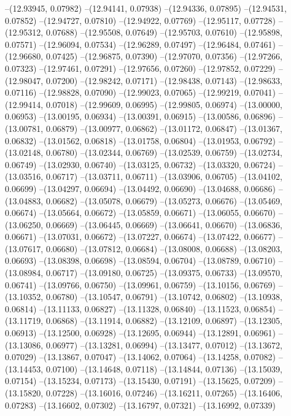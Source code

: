 --(12.93945, 0.07982)
--(12.94141, 0.07938)
--(12.94336, 0.07895)
--(12.94531, 0.07852)
--(12.94727, 0.07810)
--(12.94922, 0.07769)
--(12.95117, 0.07728)
--(12.95312, 0.07688)
--(12.95508, 0.07649)
--(12.95703, 0.07610)
--(12.95898, 0.07571)
--(12.96094, 0.07534)
--(12.96289, 0.07497)
--(12.96484, 0.07461)
--(12.96680, 0.07425)
--(12.96875, 0.07390)
--(12.97070, 0.07356)
--(12.97266, 0.07323)
--(12.97461, 0.07291)
--(12.97656, 0.07260)
--(12.97852, 0.07229)
--(12.98047, 0.07200)
--(12.98242, 0.07171)
--(12.98438, 0.07143)
--(12.98633, 0.07116)
--(12.98828, 0.07090)
--(12.99023, 0.07065)
--(12.99219, 0.07041)
--(12.99414, 0.07018)
--(12.99609, 0.06995)
--(12.99805, 0.06974)
--(13.00000, 0.06953)
--(13.00195, 0.06934)
--(13.00391, 0.06915)
--(13.00586, 0.06896)
--(13.00781, 0.06879)
--(13.00977, 0.06862)
--(13.01172, 0.06847)
--(13.01367, 0.06832)
--(13.01562, 0.06818)
--(13.01758, 0.06804)
--(13.01953, 0.06792)
--(13.02148, 0.06780)
--(13.02344, 0.06769)
--(13.02539, 0.06759)
--(13.02734, 0.06749)
--(13.02930, 0.06740)
--(13.03125, 0.06732)
--(13.03320, 0.06724)
--(13.03516, 0.06717)
--(13.03711, 0.06711)
--(13.03906, 0.06705)
--(13.04102, 0.06699)
--(13.04297, 0.06694)
--(13.04492, 0.06690)
--(13.04688, 0.06686)
--(13.04883, 0.06682)
--(13.05078, 0.06679)
--(13.05273, 0.06676)
--(13.05469, 0.06674)
--(13.05664, 0.06672)
--(13.05859, 0.06671)
--(13.06055, 0.06670)
--(13.06250, 0.06669)
--(13.06445, 0.06669)
--(13.06641, 0.06670)
--(13.06836, 0.06671)
--(13.07031, 0.06672)
--(13.07227, 0.06674)
--(13.07422, 0.06677)
--(13.07617, 0.06680)
--(13.07812, 0.06684)
--(13.08008, 0.06688)
--(13.08203, 0.06693)
--(13.08398, 0.06698)
--(13.08594, 0.06704)
--(13.08789, 0.06710)
--(13.08984, 0.06717)
--(13.09180, 0.06725)
--(13.09375, 0.06733)
--(13.09570, 0.06741)
--(13.09766, 0.06750)
--(13.09961, 0.06759)
--(13.10156, 0.06769)
--(13.10352, 0.06780)
--(13.10547, 0.06791)
--(13.10742, 0.06802)
--(13.10938, 0.06814)
--(13.11133, 0.06827)
--(13.11328, 0.06840)
--(13.11523, 0.06854)
--(13.11719, 0.06868)
--(13.11914, 0.06882)
--(13.12109, 0.06897)
--(13.12305, 0.06913)
--(13.12500, 0.06928)
--(13.12695, 0.06944)
--(13.12891, 0.06961)
--(13.13086, 0.06977)
--(13.13281, 0.06994)
--(13.13477, 0.07012)
--(13.13672, 0.07029)
--(13.13867, 0.07047)
--(13.14062, 0.07064)
--(13.14258, 0.07082)
--(13.14453, 0.07100)
--(13.14648, 0.07118)
--(13.14844, 0.07136)
--(13.15039, 0.07154)
--(13.15234, 0.07173)
--(13.15430, 0.07191)
--(13.15625, 0.07209)
--(13.15820, 0.07228)
--(13.16016, 0.07246)
--(13.16211, 0.07265)
--(13.16406, 0.07283)
--(13.16602, 0.07302)
--(13.16797, 0.07321)
--(13.16992, 0.07339)
